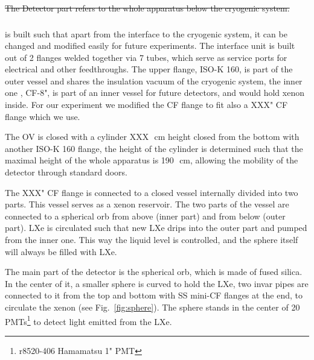 \sout{The Detector part refers to the whole apparatus below the cryogenic system.} 

\subsubsection{}
\label{subsubsec:detchamber}

 is built such that apart from the interface to 
the cryogenic system, it can be changed and modified easily for future experiments.
The interface unit is built out of 2 flanges welded together via 7 tubes, which serve as service ports for electrical and other feedthroughs. 
The upper flange, ISO-K 160, is part of the outer vessel and shares the insulation vacuum of the cryogenic system, the inner one , CF-8", is 
part of an inner vessel for future detectors, and would hold xenon inside. For our experiment we modified the CF flange to fit also a XXX" CF 
flange which we use.

The OV is closed with a cylinder XXX~\,cm height closed from the bottom with another ISO-K 160 flange, the height of the cylinder is determined 
such that the maximal height of the whole apparatus is 190~\,cm, allowing the mobility of the detector through standard doors.
 
The XXX" CF flange is connected to a closed vessel internally divided into two parts. This vessel serves as a xenon reservoir. The two parts of 
the vessel are connected to a spherical orb from above (inner part) and from below (outer part). LXe is circulated such that new LXe drips into 
the outer part and pumped from the inner one. This way the liquid level is controlled, and the sphere itself will always be filled with LXe. 

The main part of the detector is the spherical orb, which is made of fused silica. In the center of it, a smaller sphere is curved to hold the 
LXe, two invar pipes are connected to it from the top and bottom with SS mini-CF flanges at the end, to circulate the xenon (see Fig.~\ref{fig:sphere}). 
The sphere stands in the center of 20 PMTs\footnote{r8520-406 Hamamatsu 1" PMT} to detect light emitted from the LXe.

